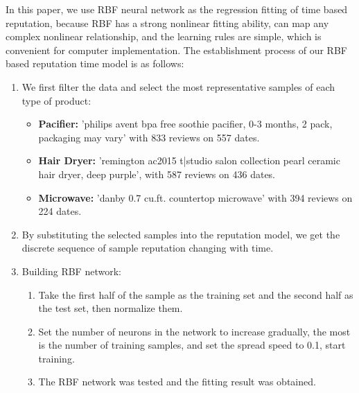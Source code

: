 \documentclass{mcmthesis}
\begin{document}
In this paper, we use RBF neural network as the regression fitting of time based reputation, because RBF has a strong nonlinear fitting ability, can map any complex nonlinear relationship, and the learning rules are simple, which is convenient for computer implementation. The establishment process of our RBF based reputation time model is as follows:
\begin{enumerate}
	\item We first filter the data and select the most representative samples of each type of product:
	\begin{itemize}
		\item \textbf{Pacifier: }'philips avent bpa free soothie pacifier, 0-3 months, 2 pack, packaging may vary' with 833 reviews on 557 dates.
		\item \textbf{Hair Dryer: }'remington ac2015 t|studio salon collection pearl ceramic hair dryer, deep purple', with 587 reviews on 436 dates.
		\item \textbf{Microwave: }'danby 0.7 cu.ft. countertop microwave' with 394 reviews on 224 dates.
	\end{itemize}
	\item By substituting the selected samples into the reputation model, we get the discrete sequence of sample reputation changing with time.
	\item Building RBF network:
	\begin{enumerate}
		\item Take the first half of the sample as the training set and the second half as the test set, then normalize them.
		\item Set the number of neurons in the network to increase gradually, the most is the number of training samples, and set the spread speed to 0.1, start training.
		\item The RBF network was tested and the fitting result was obtained.
	\end{enumerate}
\end{enumerate}
\end{document}
